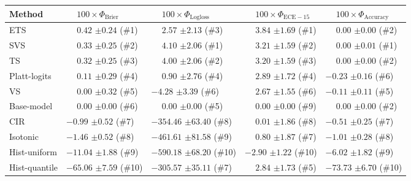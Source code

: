 \begin{tabular}{lllll}
\toprule
Method & $\phantom{-} 100 \times \Phi_\mathrm{Brier}$ & $\phantom{-} 100 \times \Phi_\mathrm{Logloss}$ & $\phantom{-} 100 \times \Phi_\mathrm{ECE-15}$ & $\phantom{-} 100 \times \Phi_\mathrm{Accuracy}$ \\
\midrule
ETS & $\phantom{-}0.42$ {\tiny $\pm 0.24$} (\#1) & $\phantom{-}2.57$ {\tiny $\pm 2.13$} (\#3) & $\phantom{-}3.84$ {\tiny $\pm 1.69$} (\#1) & $\phantom{-}0.00$ {\tiny $\pm 0.00$} (\#2) \\
SVS & $\phantom{-}0.33$ {\tiny $\pm 0.25$} (\#2) & $\phantom{-}4.10$ {\tiny $\pm 2.06$} (\#1) & $\phantom{-}3.21$ {\tiny $\pm 1.59$} (\#2) & $\phantom{-}0.00$ {\tiny $\pm 0.01$} (\#1) \\
TS & $\phantom{-}0.32$ {\tiny $\pm 0.25$} (\#3) & $\phantom{-}4.00$ {\tiny $\pm 2.06$} (\#2) & $\phantom{-}3.20$ {\tiny $\pm 1.59$} (\#3) & $\phantom{-}0.00$ {\tiny $\pm 0.00$} (\#2) \\
Platt-logits & $\phantom{-}0.11$ {\tiny $\pm 0.29$} (\#4) & $\phantom{-}0.90$ {\tiny $\pm 2.76$} (\#4) & $\phantom{-}2.89$ {\tiny $\pm 1.72$} (\#4) & $-0.23$ {\tiny $\pm 0.16$} (\#6) \\
VS & $\phantom{-}0.00$ {\tiny $\pm 0.32$} (\#5) & $-4.28$ {\tiny $\pm 3.39$} (\#6) & $\phantom{-}2.67$ {\tiny $\pm 1.55$} (\#6) & $-0.11$ {\tiny $\pm 0.11$} (\#5) \\
Base-model & $\phantom{-}0.00$ {\tiny $\pm 0.00$} (\#6) & $\phantom{-}0.00$ {\tiny $\pm 0.00$} (\#5) & $\phantom{-}0.00$ {\tiny $\pm 0.00$} (\#9) & $\phantom{-}0.00$ {\tiny $\pm 0.00$} (\#2) \\
CIR & $-0.99$ {\tiny $\pm 0.52$} (\#7) & $-354.46$ {\tiny $\pm 63.40$} (\#8) & $\phantom{-}0.01$ {\tiny $\pm 1.86$} (\#8) & $-0.51$ {\tiny $\pm 0.25$} (\#7) \\
Isotonic & $-1.46$ {\tiny $\pm 0.52$} (\#8) & $-461.61$ {\tiny $\pm 81.58$} (\#9) & $\phantom{-}0.80$ {\tiny $\pm 1.87$} (\#7) & $-1.01$ {\tiny $\pm 0.28$} (\#8) \\
Hist-uniform & $-11.04$ {\tiny $\pm 1.88$} (\#9) & $-590.18$ {\tiny $\pm 68.20$} (\#10) & $-2.90$ {\tiny $\pm 1.22$} (\#10) & $-6.02$ {\tiny $\pm 1.82$} (\#9) \\
Hist-quantile & $-65.06$ {\tiny $\pm 7.59$} (\#10) & $-305.57$ {\tiny $\pm 35.11$} (\#7) & $\phantom{-}2.84$ {\tiny $\pm 1.73$} (\#5) & $-73.73$ {\tiny $\pm 6.70$} (\#10) \\
\bottomrule
\end{tabular}
